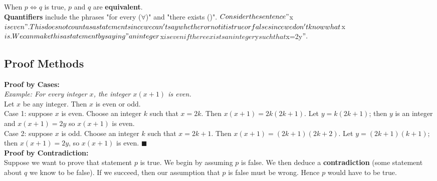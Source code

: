 \documentclass{article}
\begin{document}
    \noindent When $p\iff q$ is true, $p$ and $q$ are \textbf{equivalent}. \\

    \noindent \textbf{Quantifiers} include the phrases "for every ($\forall$)" and
    "there exists (\exists)". $Consider the sentence "$x$ is even". This does not count
    as a statement since we can't say whether or not it is true or false since we don't
    know what $x$ is. We can make this a statement by saying "an integer $x$ is even if
    there exists an integer $y$ such that $x=2y$".$

    \subsection{Proof Methods}
    \noindent \color{purple} \textbf{Proof by Cases:} \color{black} \\
    \color{blue} \textit{Example: For every integer $x$, the integer $x(x+1)$ is even.} \color{black}  \\
    Let $x$ be any integer. Then $x$ is even or odd. \\
    Case 1: suppose $x$ is even. Choose an integer $k$ such that $x=2k$. Then $x(x+1)=2k(2k+1)$.
    Let $y=k(2k+1)$; then $y$ is an integer and $x(x+1)=2y$ so $x(x+1)$ is even. \\
    Case 2: suppose $x$ is odd. Choose an integer $k$ such that $x=2k+1$. Then
    $x(x+1)=(2k+1)(2k+2)$. Let $y=(2k+1)(k+1)$; then $x(x+1)=2y$, so $x(x+1)$ is even.
    $\blacksquare$ \\

    \noindent \color{purple} \textbf{Proof by Contradiction:} \color{black} \\
    Suppose we want to prove that statement $p$ is true. We begin by assuming $p$ is false.
    We then deduce a \textbf{contradiction} (some statement about $q$ we know to be false).
    If we succeed, then our assumption that $p$ is false must be wrong. Hence $p$ would have
    to be true.
\end{document}
